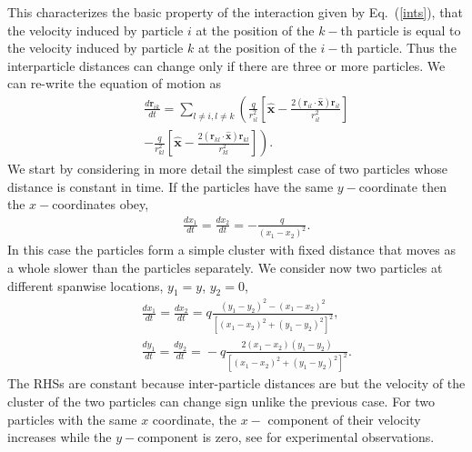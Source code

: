 This characterizes the basic property of the interaction given by Eq.~(\ref{ints}), that the velocity induced by particle $i$ at the position of the $k-$th particle is equal to the velocity induced by particle $k$ at the position of the $i-$th particle. Thus the interparticle distances can change only if there are three or more particles. We can re-write the equation of motion as
\begin{eqnarray}&&\!\!\!\!\!\!\!\!\!\!\!\!\!\!\!\!
\frac{d\bm r_{ik}}{dt}=\sum_{l\neq i, l\neq k}\left(\frac{q}{r_{il}^2}\left[\bm {\hat x}\!-\!\frac{2 \left(\bm r_{il}\cdot\bm {\hat x}\right) \bm r_{il}}{r_{il}^2}\right]\right.\nonumber\\&&\!\!\!\!\!\!\!\!\!\!\!\!\!\!\!\!\left.-\frac{q}{r_{kl}^2}\left[\bm {\hat x}\!-\!\frac{2 \left(\bm r_{kl}\cdot\bm {\hat x}\right) \bm r_{kl}}{r_{kl}^2}\right]\right).
\end{eqnarray}
We start by considering in more detail the simplest case of two particles whose distance is constant in time. If the particles have the same $y-$coordinate then the $x-$coordinates obey,
\begin{eqnarray}&&\!\!\!\!\!\!\!\!\!\!\!\!\!\!\!\!
\frac{dx_1}{dt}=\frac{dx_2}{dt}=-\frac{q}{(x_1-x_2)^2}.
\end{eqnarray}
In this case the particles form a simple cluster with fixed distance that  moves as a whole slower than the particles separately. We consider now two particles at different spanwise locations, $y_1=y$, $y_2=0$,
\begin{eqnarray}&&\!\!\!\!\!\!\!\!\!\!\!\!\!\!\!\!
\frac{dx_1}{dt}=\frac{dx_2}{dt}=\!q\frac{(y_1-y_2)^2-(x_1-x_2)^2}{\left[(x_1-x_2)^2+(y_1-y_2)^2\right]^2},\nonumber\\&&\!\!\!\!\!\!\!\!\!\!\!\!\!\!\!\!\!
\frac{dy_1}{dt}=\frac{dy_2}{dt}\!=\!-q\frac{2(x_1-x_2)(y_1-y_2)}{\left[(x_1-x_2)^2+(y_1-y_2)^2\right]^2}.
\end{eqnarray}
The RHSs are constant because inter-particle distances are but the velocity of the cluster of the two particles can change sign unlike the previous case. For two particles with the same $x$ coordinate, the $x-$ component of their velocity increases while the $y-$component is zero, see \cite{tab0} for experimental observations.

